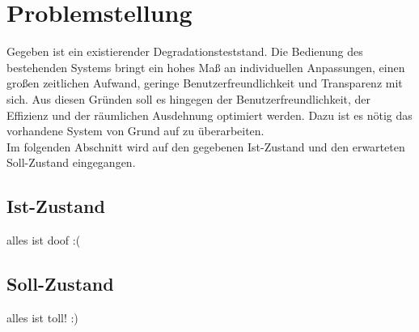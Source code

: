 
\chapter{Problemstellung}
\label{chapter_Problemstellung}
Gegeben ist ein existierender Degradationsteststand. Die Bedienung des bestehenden Systems bringt ein hohes Maß an individuellen Anpassungen, einen großen zeitlichen Aufwand, geringe Benutzerfreundlichkeit und Transparenz mit sich. Aus diesen Gründen soll es hingegen der Benutzerfreundlichkeit, der Effizienz und der räumlichen Ausdehnung optimiert werden. Dazu ist es nötig das vorhandene System von Grund auf zu überarbeiten.\\
Im folgenden Abschnitt wird auf den gegebenen Ist-Zustand und den erwarteten Soll-Zustand eingegangen.

\clearpage
\section{Ist-Zustand}
\label{section_Ist-Zustand}
alles ist doof :(

\section{Soll-Zustand}
\label{section_Ist-Zustand}
alles ist toll! :)